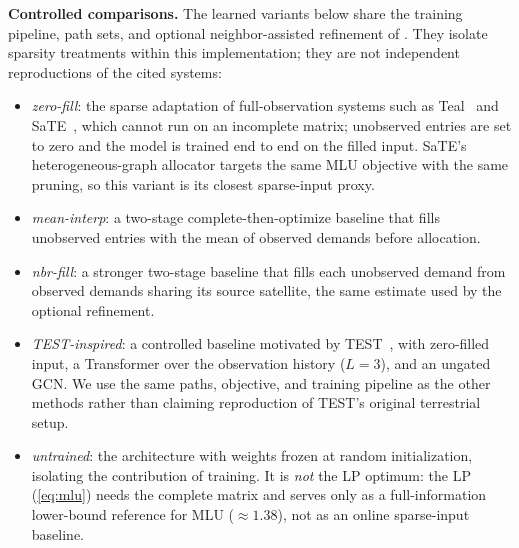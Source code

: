 \textbf{Controlled comparisons.} The learned variants below share the
training pipeline, path sets, and optional neighbor-assisted refinement of
\sysname{}. They isolate sparsity treatments within this implementation;
they are not independent reproductions of the cited systems:
\begin{itemize}
    \item \emph{zero-fill}: the sparse adaptation of full-observation
    systems such as Teal~\cite{teal} and SaTE~\cite{sate}, which
    cannot run on an incomplete matrix; unobserved entries are set to
    zero and the model is trained end to end on the filled input.
    SaTE's heterogeneous-graph allocator targets the same
    MLU objective with the same pruning, so this variant is its
    closest sparse-input proxy.
    \item \emph{mean-interp}: a two-stage complete-then-optimize
    baseline that fills unobserved entries with the mean of observed
    demands before allocation.
    \item \emph{nbr-fill}: a stronger two-stage baseline that fills
    each unobserved demand from observed demands sharing its source
    satellite, the same estimate used by the optional refinement.
    \item \emph{TEST-inspired}: a controlled baseline motivated by
    TEST~\cite{test}, with zero-filled input, a Transformer over the
    observation history ($L=3$), and an ungated GCN. We use the same paths,
    objective, and training pipeline as the other methods rather than
    claiming reproduction of TEST's original terrestrial setup.
    \item \emph{untrained}: the \sysname{} architecture with weights
    frozen at random initialization, isolating the contribution of
    training. It is \emph{not} the LP optimum: the LP (\cref{eq:mlu}) needs
    the complete matrix and serves only as a full-information lower-bound
    reference for MLU (${\approx}1.38$), not as an online sparse-input baseline.
\end{itemize}

